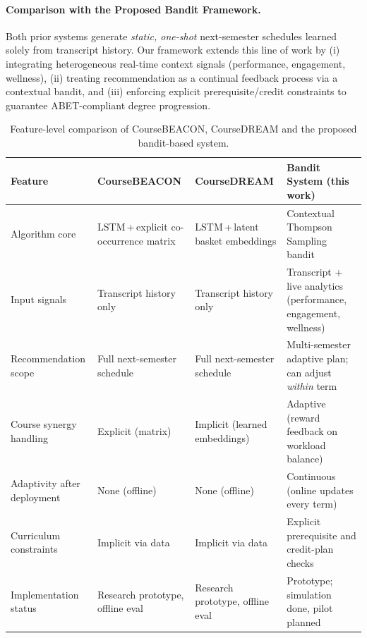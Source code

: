 \documentclass[conference]{IEEEtran}
\begin{document}
\paragraph*{Comparison with the Proposed Bandit Framework.}
Both prior systems generate \emph{static, one-shot} next-semester schedules learned solely from transcript history.  
Our framework extends this line of work by (i) integrating heterogeneous real-time context signals (performance, engagement, wellness), (ii) treating recommendation as a continual feedback process via a contextual bandit, and (iii) enforcing explicit prerequisite/credit constraints to guarantee ABET-compliant degree progression.

\begin{table}[!t]
  \caption{Feature-level comparison of CourseBEACON, CourseDREAM and the proposed bandit-based system.}
  \label{tab:beacondream}
  \centering
  \renewcommand{\arraystretch}{1.15}
  \begin{tabular}{p{3.2cm} p{4.2cm} p{4.2cm} p{4.2cm}}
    \toprule
    \textbf{Feature} & \textbf{CourseBEACON \cite{Khan2023Beacon}} & \textbf{CourseDREAM \cite{Khan2023Dream}} & \textbf{Bandit System (this work)}\\
    \midrule
    Algorithm core & LSTM\,+\,explicit co-occurrence matrix & LSTM\,+\,latent basket embeddings & Contextual Thompson Sampling bandit \\
    Input signals & Transcript history only & Transcript history only & Transcript + live analytics (performance, engagement, wellness) \\
    Recommendation scope & Full next-semester schedule & Full next-semester schedule & Multi-semester adaptive plan; can adjust \emph{within} term \\
    Course synergy handling & Explicit (matrix) & Implicit (learned embeddings) & Adaptive (reward feedback on workload balance) \\
    Adaptivity after deployment & None (offline) & None (offline) & Continuous (online updates every term) \\
    Curriculum constraints & Implicit via data & Implicit via data & Explicit prerequisite and credit-plan checks \\
    Implementation status & Research prototype, offline eval & Research prototype, offline eval & Prototype; simulation done, pilot planned \\
    \bottomrule
  \end{tabular}
\end{table}
\end{document}
